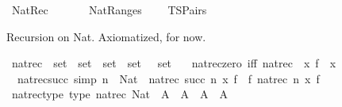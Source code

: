 %
\begin{isabellebody}%
%
%
\isadelimdocument
%
\endisadelimdocument
%
\isatagdocument
\isanewline
\isanewline
%
\isamarkuptrue%
%
\endisatagdocument
{\isafolddocument}%
%
\isadelimdocument
%
\endisadelimdocument
%
\isadelimtheory
%
\endisadelimtheory
%
\isatagtheory
{}\isamarkupfalse%
\ Nat{\isacharunderscore}{\kern0pt}Rec\isanewline
\ \ \isanewline
\ \ \ \ Nat{\isacharunderscore}{\kern0pt}Ranges\isanewline
\ \ \ \ TSPairs\isanewline
{}%
\endisatagtheory
{\isafoldtheory}%
%
\isadelimtheory
%
\endisadelimtheory
%
\begin{isamarkuptext}%
Recursion on Nat. Axiomatized, for now.%
\end{isamarkuptext}\isamarkuptrue%
\isamarkupfalse%
\ nat{\isacharunderscore}{\kern0pt}rec\ {\isacharcolon}{\kern0pt}{\isacharcolon}{\kern0pt}\ {\isachardoublequoteopen}set\ {\isasymRightarrow}\ set\ {\isasymRightarrow}\ {\isacharparenleft}{\kern0pt}set\ {\isasymRightarrow}\ set{\isacharparenright}{\kern0pt}\ \ {\isasymRightarrow}\ set{\isachardoublequoteclose}\ \isanewline
\ \ nat{\isacharunderscore}{\kern0pt}rec{\isacharunderscore}{\kern0pt}zero\ {\isacharbrackleft}{\kern0pt}iff{\isacharbrackright}{\kern0pt}{\isacharcolon}{\kern0pt}\ {\isachardoublequoteopen}nat{\isacharunderscore}{\kern0pt}rec\ {}\ x\ f\ {\isacharequal}{\kern0pt}\ x\ \isanewline
\ \ nat{\isacharunderscore}{\kern0pt}rec{\isacharunderscore}{\kern0pt}succ\ {\isacharbrackleft}{\kern0pt}simp{\isacharbrackright}{\kern0pt}{\isacharcolon}{\kern0pt}\ {\isachardoublequoteopen}n\ {\isacharcolon}{\kern0pt}\ Nat\ {\isasymLongrightarrow}\ nat{\isacharunderscore}{\kern0pt}rec\ {\isacharparenleft}{\kern0pt}succ\ n{\isacharparenright}{\kern0pt}\ x\ f\ {\isacharequal}{\kern0pt}\ f\ {\isacharparenleft}{\kern0pt}nat{\isacharunderscore}{\kern0pt}rec\ n\ x\ f{\isacharparenright}{\kern0pt}{\isachardoublequoteclose}\isanewline
\isanewline
{}\isamarkupfalse%
\ nat{\isacharunderscore}{\kern0pt}rec{\isacharunderscore}{\kern0pt}type\ {\isacharbrackleft}{\kern0pt}type{\isacharbrackright}{\kern0pt}{\isacharcolon}{\kern0pt}\ {\isachardoublequoteopen}nat{\isacharunderscore}{\kern0pt}rec{\isacharcolon}{\kern0pt}\ Nat\ {\isasymRightarrow}\ A\ {\isasymRightarrow}\ {\isacharparenleft}{\kern0pt}A\ {\isasymRightarrow}\ A{\isacharparenright}{\kern0pt}\ {\isasymRightarrow}\ A{\isachardoublequoteclose}\isanewline

\end{isabellebody}
